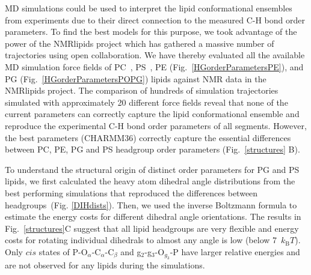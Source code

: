 \documentclass[aps,prl,superscriptaddress,twocolumn]{revtex4}
\begin{document}
MD simulations could be used to interpret the lipid conformational ensembles from experiments due to their direct connection to the measured C-H bond order parameters. To find the best models for this purpose, we took advantage of the power of the NMRlipids project which has gathered a massive number of trajectories using open collaboration. We have thereby evaluated all the available MD simulation force fields of PC~\cite{botan15}, PS~\cite{antila19}, PE (Fig.~\ref{HGorderParametersPE}), and PG (Fig.~\ref{HGorderParametersPOPG}) lipids against NMR data in the NMRlipids project. The comparison of hundreds of simulation trajectories simulated with approximately 20 different force fields reveal that none of the current parameters can correctly capture the lipid conformational ensemble and reproduce the experimental C-H bond order parameters of all segments. However, the best parameters (CHARMM36) correctly capture the essential differences between PC, PE, PG and PS headgroup order parameters (Fig.~\ref{structures} B). 

To understand the structural origin of distinct order parameters for PG and PS lipids,
we first calculated the heavy atom dihedral angle distributions from the best performing simulations that reproduced the differences between headgroups~(Fig. \ref{DIHdists}).
Then, we used the inverse Boltzmann formula to estimate the
energy costs for different dihedral angle orientations.
The results in Fig.~\ref{structures}C suggest that all lipid headgroups are very flexible and
energy costs for rotating individual dihedrals to almost any angle is low (below 7~$k_\mathrm{B}T$).
Only $cis$ states of P-O$_\alpha$-C$_\alpha$-C$_\beta$ and g$_2$-g$_3$-O$_{g_3}$-P have larger relative
energies and are not observed for any lipids during the simulations.
\end{document}

